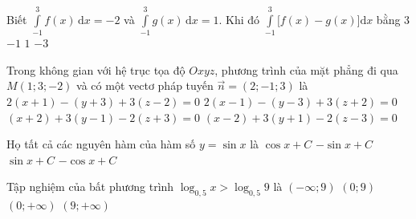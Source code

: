 \begin{ex}%
	Biết $\displaystyle \int\limits_{-1}^3 f(x) \mathrm{\,d}x = -2$ và $\displaystyle \int\limits_{-1}^3 g(x) \mathrm{\,d}x = 1$. Khi đó $\displaystyle \int\limits_{-1}^3 \big[f(x) - g(x)\big] \mathrm{d}x$ bằng
	\choice
		{$3$}
		{$-1$}
		{$1$}
		{\True $-3$}
\end{ex}

\begin{ex}%
	Trong không gian với hệ trục tọa độ $Oxyz$, phương trình của mặt phẳng đi qua $M(1;3;-2)$ và có một vectơ pháp tuyến $\vec{n} = (2;-1;3)$ là
	\choice
		{$2(x+1) - (y+3) + 3(z-2) = 0$}
		{\True $2(x-1) - (y-3) + 3(z+2) = 0$}
		{$(x+2) + 3(y-1) - 2(z+3) = 0$}
		{$(x-2) + 3(y+1) - 2(z-3) = 0$}
\end{ex}

\begin{ex}%
	Họ tất cả các nguyên hàm của hàm số $y = \sin x$ là
	\choice
		{$\cos x + C$}
		{$-\sin x + C$}
		{$\sin x + C$}
		{\True $-\cos x + C$}
\end{ex}

\begin{ex}%
	Tập nghiệm của bất phương trình $\log_{0{,}5} x > \log_{0{,}5} 9$ là
	\choice
		{$(-\infty;9)$}
		{\True $(0;9)$}
		{$(0;+\infty)$}
		{$(9;+\infty)$}
\end{ex}

